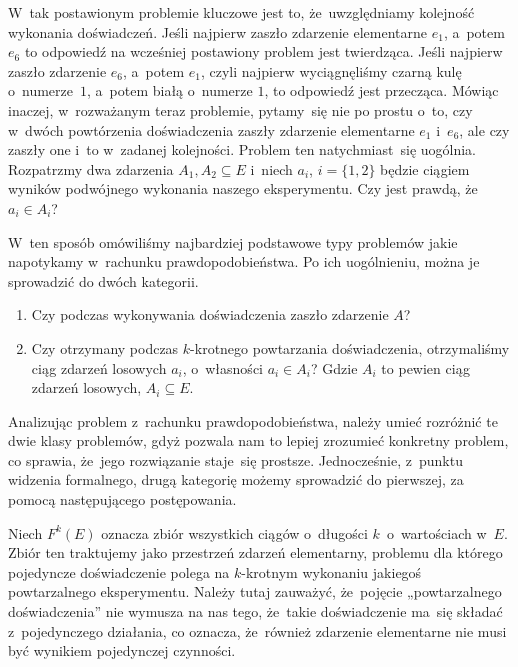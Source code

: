\documentclass[a4paper,11pt]{article}
\numberwithin{equation}{section}
\begin{document}
W~tak postawionym problemie kluczowe jest to, że~uwzględniamy kolejność
wykonania doświadczeń. Jeśli najpierw zaszło zdarzenie elementarne $e_{ 1 }$,
a~potem $e_{ 6 }$ to odpowiedź na wcześniej postawiony problem jest
twierdząca. Jeśli najpierw zaszło zdarzenie $e_{ 6 }$, a~potem $e_{ 1 }$,
czyli najpierw wyciągnęliśmy czarną kulę o~numerze~$1$, a~potem białą
o~numerze $1$, to odpowiedź jest przecząca. Mówiąc inaczej, w~rozważanym
teraz problemie, pytamy~się nie po prostu o~to, czy w~dwóch powtórzenia
doświadczenia zaszły zdarzenie elementarne $e_{ 1 }$ i~$e_{ 6 }$, ale
czy zaszły one i~to w~zadanej kolejności. Problem ten natychmiast~się
uogólnia. Rozpatrzmy dwa zdarzenia
$A_{ 1 }, A_{ 2 } \subseteq E$ i~niech $a_{ i }$, $i = \{ 1, 2 \}$ będzie ciągiem wyników
podwójnego wykonania naszego eksperymentu. Czy jest prawdą,
że~$a_{ i } \in A_{ i }$?

W~ten sposób omówiliśmy najbardziej podstawowe typy problemów jakie
napotykamy w~rachunku prawdopodobieństwa. Po ich uogólnieniu, można je
sprowadzić do dwóch kategorii.



\begin{enumerate}

\item Czy podczas wykonywania doświadczenia zaszło zdarzenie $A$?

\item Czy otrzymany podczas $k$-krotnego powtarzania doświadczenia,
  otrzymaliśmy ciąg zdarzeń losowych $a_{ i }$, o~własności
  $a_{ i } \in A_{ i }$? Gdzie $A_{ i }$ to pewien ciąg zdarzeń losowych,
  $A_{ i } \subseteq E$.

\end{enumerate}



Analizując problem z~rachunku prawdopodobieństwa, należy umieć rozróżnić te
dwie klasy problemów, gdyż pozwala nam to lepiej zrozumieć konkretny
problem, co sprawia, że~jego rozwiązanie staje~się prostsze. Jednocześnie,
z~punktu widzenia formalnego, drugą kategorię możemy sprowadzić do pierwszej,
za pomocą następującego postępowania.

Niech $F^{ k }( E )$ oznacza zbiór wszystkich ciągów o~długości
$k$~o~wartościach w~$E$. Zbiór ten traktujemy jako przestrzeń zdarzeń
elementarny, problemu dla którego pojedyncze doświadczenie polega na
$k$-krotnym wykonaniu jakiegoś powtarzalnego eksperymentu. Należy tutaj
zauważyć, że~pojęcie „powtarzalnego doświadczenia” nie wymusza na nas tego,
że~takie doświadczenie ma~się składać z~pojedynczego działania, co oznacza,
że~również zdarzenie elementarne nie musi być wynikiem pojedynczej czynności.
\end{document}
